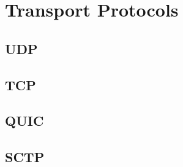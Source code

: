 \documentclass[a4paper,11pt]{book}
\theoremstyle{plain}
\theoremstyle{definition}
\begin{document}
\chapter{Transport Protocols}

\section{UDP}

\section{TCP}

\section{QUIC}

\section{SCTP}
\end{document}

